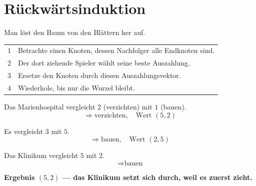 \section{Rückwärtsinduktion}

\begin{merksatz}
Man löst den Baum von den Blättern her auf.

\begin{center}
{\small
\renewcommand{\arraystretch}{1.5}
\begin{tabular}{@{}P{1.0cm}P{7.4cm}@{}}
\toprule
$1$ & Betrachte einen Knoten, dessen Nachfolger alle Endknoten sind.\\
$2$ & Der dort ziehende Spieler wählt seine beste Auszahlung.\\
$3$ & Ersetze den Knoten durch diesen Auszahlungsvektor.\\
$4$ & Wiederhole, bis nur die Wurzel bleibt.\\
\bottomrule
\end{tabular}}
\end{center}

 Das Marienhospital vergleicht $2$ (verzichten) mit $1$ (bauen).
\[ \Longrightarrow \text{verzichten}, \quad \text{Wert } (5,2) \]

 Es vergleicht $3$ mit $5$.
\[ \Longrightarrow \text{bauen}, \quad \text{Wert } (2,5) \]

 Das Klinikum vergleicht $5$ mit $2$.
\[ \Longrightarrow \text{bauen} \]

\begin{center}
\begin{minipage}{0.9\textwidth}
\textbf{Ergebnis $(5,2)$ --- das Klinikum setzt sich durch, weil es zuerst zieht.}
\end{minipage}
\end{center}

\begin{center}
\begin{minipage}{0.88\textwidth}
\end{minipage}
\end{center}
\end{merksatz}

